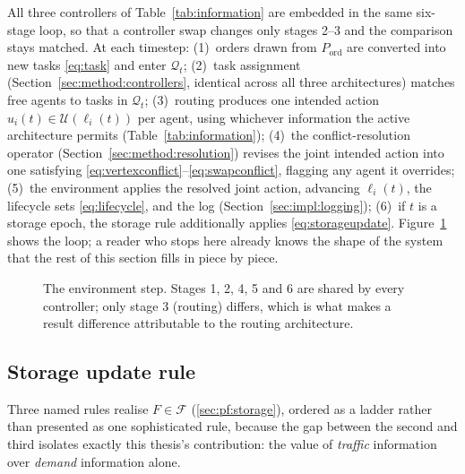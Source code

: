 \documentclass[../main.tex]{subfiles}
\begin{document}
All three controllers of Table~\ref{tab:information} are embedded in the same
six-stage loop, so that a controller swap changes only stages 2--3 and the
comparison stays matched. At each timestep: (1)~orders drawn from
$P_{\mathrm{ord}}$ are converted into new tasks \eqref{eq:task} and enter
$\mathcal{Q}_t$; (2)~task assignment (Section~\ref{sec:method:controllers},
identical across all three architectures) matches free agents to tasks in
$\mathcal{Q}_t$; (3)~routing produces one intended action
$u_i(t)\in\mathcal{U}(\ell_i(t))$ per agent, using whichever information the
active architecture permits (Table~\ref{tab:information}); (4)~the
conflict-resolution operator (Section~\ref{sec:method:resolution}) revises
the joint intended action into one satisfying
\eqref{eq:vertexconflict}--\eqref{eq:swapconflict}, flagging any agent it
overrides; (5)~the environment applies the resolved joint action, advancing
$\ell_i(t)$, the lifecycle sets \eqref{eq:lifecycle}, and the log
(Section~\ref{sec:impl:logging}); (6)~if $t$ is a storage epoch, the storage
rule additionally applies \eqref{eq:storageupdate}. Figure~\ref{fig:methodloop}
shows the loop; a reader who stops here already knows the shape of the system
that the rest of this section fills in piece by piece.

\begin{figure}[t]
  \centering
  \caption{The environment step. Stages 1, 2, 4, 5 and 6 are shared by every
  controller; only stage 3 (routing) differs, which is what makes a result
  difference attributable to the routing architecture.}
  \label{fig:methodloop}
\end{figure}

\subsection{Storage update rule}
\label{sec:method:storage}

Three named rules realise $F \in \mathcal{F}$ (\ref{sec:pf:storage}), ordered
as a ladder rather than presented as one sophisticated rule, because the gap
between the second and third isolates exactly this thesis's contribution: the
value of \emph{traffic} information over \emph{demand} information alone.
\end{document}
